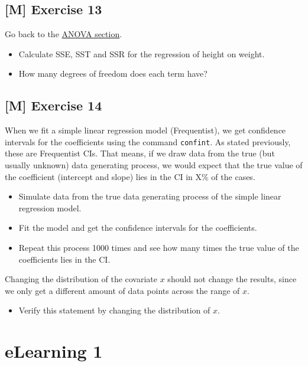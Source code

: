 \documentclass[
]{book}
\providecommand{\tightlist}{%
  \setlength{\itemsep}{0pt}\setlength{\parskip}{0pt}}
\begin{document}
\subsection{{[}M{]} Exercise 13}\label{exercise13_simpl_lin_reg}

Go back to the \hyperref[analysis_of_variance]{ANOVA section}.

\begin{itemize}
\item
  Calculate SSE, SST and SSR for the regression of height on weight.
\item
  How many degrees of freedom does each term have?
\end{itemize}

\subsection{{[}M{]} Exercise 14}\label{exercise14_simpl_lin_reg}

When we fit a simple linear regression model (Frequentist), we get confidence intervals for the coefficients
using the command \texttt{confint}. As stated previously, these are Frequentist CIs. That means,
if we draw data from the true (but usually unknown) data generating process, we would expect
that the true value of the coefficient (intercept and slope) lies in the CI in X\% of the cases.

\begin{itemize}
\tightlist
\item
  Simulate data from the true data generating process of the simple linear regression model.
\item
  Fit the model and get the confidence intervals for the coefficients.
\item
  Repeat this process 1000 times and see how many times the true value of the coefficients
  lies in the CI.
\end{itemize}

Changing the distribution of the covariate \(x\) should not change the results, since
we only get a different amount of data points across the range of \(x\).

\begin{itemize}
\tightlist
\item
  Verify this statement by changing the distribution of \(x\).
\end{itemize}

\section{eLearning 1}\label{elearning-1}
\end{document}
